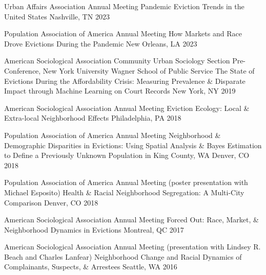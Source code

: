 \begin{cventries}
    
  \cventry
    {Urban Affairs Association Annual Meeting} %
    {Pandemic Eviction Trends in the United States} %
    {Nashville, TN} %
    {2023} %
    {}    
    
  \cventry
    {Population Association of America Annual Meeting} %
    {How Markets and Race Drove Evictions During the Pandemic} %
    {New Orleans, LA} %
    {2023} %
    {}
    
  \cventry
    {American Sociological Association Community Urban Sociology Section Pre-Conference, New York University Wagner School of Public Service} %
    {The State of Evictions During the Affordability Crisis: Measuring Prevalence \& Disparate Impact through Machine Learning on Court Records} %
    {New York, NY} %
    {2019} %
    {}
    
  \cventry
    {American Sociological Association Annual Meeting} %
    {Eviction Ecology: Local \& Extra-local Neighborhood Effects} %
    {Philadelphia, PA} %
    {2018} %
    {}
    
  \cventry
    {Population Association of America Annual Meeting} %
    {Neighborhood \& Demographic Disparities in Evictions: Using Spatial Analysis \& Bayes Estimation to Define a Previously Unknown Population in King County, WA} %
    {Denver, CO} %
    {2018} %
    {}
    
  \cventry
    {Population Association of America Annual Meeting (poster presentation with Michael Esposito)} %
    {Health \& Racial Neighborhood Segregation: A Multi-City Comparison} %
    {Denver, CO} %
    {2018} %
    {}
    
  \cventry
    {American Sociological Association Annual Meeting} %
    {Forced Out: Race, Market, \& Neighborhood Dynamics in Evictions} %
    {Montreal, QC} %
    {2017} %
    {}

  \cventry
    {American Sociological Association Annual Meeting (presentation with Lindsey R. Beach and Charles Lanfear)} %
    {Neighborhood Change and Racial Dynamics of Complainants, Suspects, \& Arrestees} %
    {Seattle, WA} %
    {2016} %
    {}


\end{cventries}
